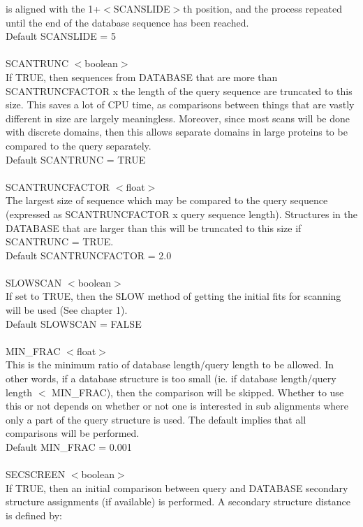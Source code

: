     is aligned with  the 1+$<$SCANSLIDE$>$th position, and the process
    repeated until the end of the database sequence has been reached.\\
    Default SCANSLIDE = 5 \\
    \\
    SCANTRUNC $<$boolean$>$\\
    If TRUE, then sequences from DATABASE that are more than
    SCANTRUNCFACTOR x the length of the query sequence are truncated to
    this size.  This saves a lot of CPU time, as comparisons between 
    things that are vastly different in size are largely meaningless. 
    Moreover, since most scans will be done with discrete domains, then
    this allows separate domains in large proteins to be compared 
    to the query separately.\\
    Default SCANTRUNC = TRUE\\
    \\
    SCANTRUNCFACTOR $<$float$>$\\
    The largest size of sequence which may be compared to the query 
    sequence (expressed as SCANTRUNCFACTOR x query sequence length). 
    Structures in the DATABASE that are larger than this will be
    truncated  to this size if SCANTRUNC = TRUE.\\
    Default SCANTRUNCFACTOR = 2.0\\
    \\
    SLOWSCAN $<$boolean$>$\\
    If set to TRUE, then the SLOW method of getting the initial fits
    for scanning will be used (See chapter 1).\\
    Default SLOWSCAN = FALSE\\
    \\
    MIN\_FRAC $<$float$>$\\
    This is the minimum ratio of database length/query length to be 
    allowed.  In other words, if a database structure is too small 
    (ie. if database length/query length $<$ MIN\_FRAC), then the
    comparison will be skipped.  Whether to use this or not depends on
    whether or not one is interested in sub alignments where only a
    part of the query structure is used.  The default implies that all
    comparisons will be performed.\\
    Default MIN\_FRAC = 0.001\\
    \\
    SECSCREEN $<$boolean$>$\\
    If TRUE, then an initial comparison between query and DATABASE
    secondary structure assignments (if available) is performed.  A
    secondary structure distance is defined by:\\

